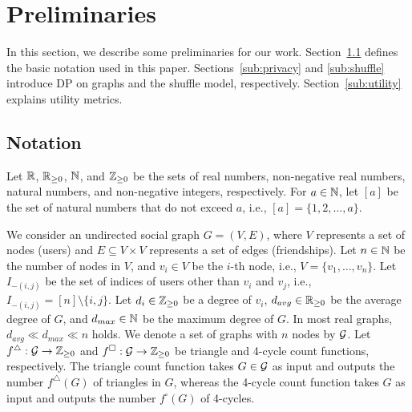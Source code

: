 \section{Preliminaries}
\label{sec:preliminaries}
In this section, we describe some preliminaries for our work. 
Section~\ref{sub:notations} defines the basic notation used in this paper. 
Sections~\ref{sub:privacy} and \ref{sub:shuffle} introduce DP on graphs and the shuffle model, respectively. 
Section~\ref{sub:utility} explains utility metrics. 

\subsection{Notation}
\label{sub:notations}
Let $\mathbb{R}$, $\mathbb{R}_{\ge0}$, $\mathbb{N}$, and $\mathbb{Z}_{\ge0}$ be the sets of real numbers, non-negative real numbers, natural numbers, and non-negative integers, respectively. 
For $a\in\mathbb{N}$, let $[a]$ be the set of natural numbers that do not exceed $a$, i.e., $[a] = \{1, 2, \ldots, a\}$. 

We consider an undirected social graph $G=(V,E)$, where $V$ represents a set of nodes (users) and $E \subseteq V \times V$ represents a set of edges (friendships). 
Let $n\in\mathbb{N}$ be the number of nodes in $V$, and $v_i \in V$ be the $i$-th node, i.e., $V=\{v_1,\ldots,v_n\}$. 
Let $I_{-(i,j)}$ be the set of indices of users other than $v_i$ and $v_j$, i.e., $I_{-(i,j)} = [n]\setminus\{i,j\}$. 
Let 
$d_i \in \mathbb{Z}_{\ge0}$ be a degree of $v_i$, 
$d_{avg} \in \mathbb{R}_{\ge0}$ be the average degree of $G$, and $d_{max} \in \mathbb{N}$ be the maximum degree of $G$. 
In most real graphs, $d_{avg} \ll d_{max} \ll n$ holds. 
We denote a set of graphs with $n$ nodes by $\mathcal{G}$. 
Let $f^\triangle: \mathcal{G} \rightarrow \mathbb{Z}_{\ge0}$ and $f^\square: \mathcal{G} \rightarrow \mathbb{Z}_{\ge0}$ be triangle and 4-cycle count functions, respectively. 
The triangle count function takes $G \in \mathcal{G}$ as input and outputs the number $f^\triangle(G)$ of triangles in $G$, 
whereas the 4-cycle count function takes $G$ as input and outputs the number $f^\square(G)$ of 4-cycles. 

